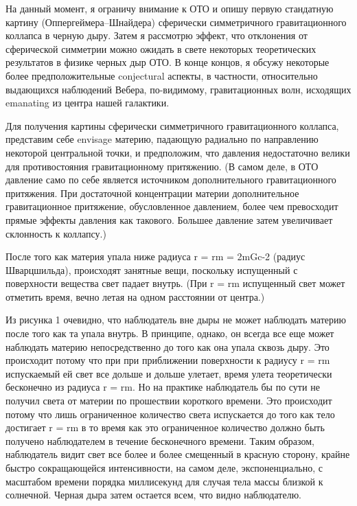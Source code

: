 \documentclass[a4paper, 10pt, twocolumn]{article}
\def\q#1{{\color{red} #1}}
\begin{document}
На данный момент, я ограничу внимание к ОТО и опишу первую стандатную 
картину (Оппергеймера--Шнайдера) сферически симметричного 
гравитационного коллапса в черную дыру. Затем я рассмотрю эффект, что 
отклонения от сферической симметрии можно ожидать в свете некоторых 
теоретических результатов в физике черных дыр ОТО. В конце концов, 
я обсужу некоторые более предположительные \q{conjectural} аспекты, 
в частности, относительно выдающихся наблюдений Вебера, по-видимому, 
гравитационных волн, исходящих \q{emanating} из центра нашей галактики.

Для получения картины сферически симметричного гравитационного коллапса, 
представим себе \q{envisage} материю, падающую радиально по направлению 
некоторой центральной точки, и предположим, что давления недостаточно 
велики для противостояния гравитационному притяжению. (В самом деле, 
в ОТО давление само по себе является источником дополнительного 
гравитационного притяжения. При достаточной концентрации материи 
дополнительное гравитационное притяжение, обусловленное давлением, более 
чем превосходит прямые эффекты давления как такового. Большее давление 
затем увеличивает склонность к коллапсу.)

После того как материя упала ниже радиуса r = rm = 2mGc-2 (радиус 
Шварцшильда), происходят занятные вещи, поскольку испущенный 
с поверхности вещества свет падает внутрь. (При r = rm испущенный свет 
может отметить время, вечно летая на одном расстоянии от центра.)

Из рисунка 1 очевидно, что наблюдатель вне дыры не может наблюдать 
материю после того как та упала внутрь. В принципе, однако, он всегда 
все еще может наблюдать материю непосредственно до того как она упала 
сквозь дыру. Это происходит потому что при при приближении поверхности 
к радиусу r = rm испускаемый ей свет все дольше и дольше улетает, время 
улета теоретически бесконечно из радиуса r = rm. Но на практике 
наблюдатель бы по сути не получил света от материи по прошествии 
короткого времени. Это происходит потому что лишь ограниченное 
количество света испускается до того как тело достигает r = rm в то 
время как это ограниченное количество должно быть получено наблюдателем 
в течение бесконечного времени. Таким образом, наблюдатель видит свет 
все более и более смещенный в красную сторону, крайне быстро 
сокращающейся интенсивности, на самом деле, экспоненциально, с масштабом 
времени порядка миллисекунд для случая тела массы близкой к солнечной. 
Черная дыра затем остается всем, что видно наблюдателю.
\end{document}
